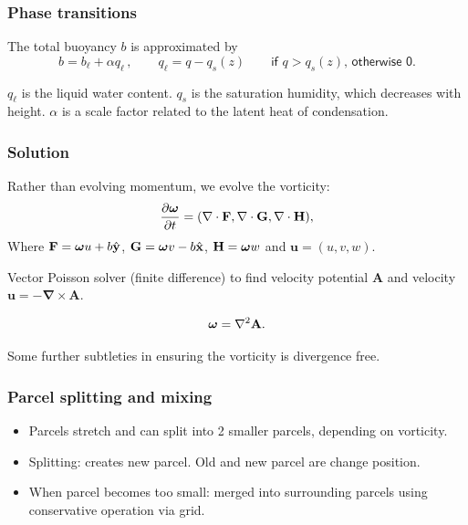 \documentclass{beamer}
\def\oran#1{\color{orange} #1}
\def\re#1{\color{red}   #1}
\def\bl#1{\color{blue}  #1}
\newcommand{\bel}{\ensuremath{b_\ell}}
\renewcommand{\v}[1]{\ensuremath{\mathbf{#1}}} %
\newcommand{\gv}[1]{\ensuremath{\mbox{\boldmath$ #1 $}}}
\newcommand{\uv}[1]{\hat{\ensuremath{\mathbf{ #1 }}}} %
\newcommand{\pd}[2]{\frac{\partial #1}{\partial #2}}
\renewcommand{\div}[1]{\v{\nabla} \cdot #1} %
\newcommand{\curl}[1]{\v{\nabla} \times #1} %
\begin{document}
\begin{frame}
\frametitle{Phase transitions}
The {\re total buoyancy} $b$ is approximated by
\begin{equation}
b = \bel+\alpha q_\ell \,,\qquad q_\ell =q-q_s(z) \qquad \textsf{if } q>q_s(z) \textsf{, otherwise 0}.
\nonumber
\end{equation}

$q_\ell$ is the {\bl liquid water content}. \newline
$q_s$ is the {\oran saturation humidity}, which decreases with height. \newline
$\alpha$ is a scale factor related to the {\re latent heat of condensation.} \newline

\end{frame}

\begin{frame}
\frametitle{Solution}

Rather than evolving momentum, we evolve the vorticity:
\begin{equation}
  \pd{\gv{\omega}}{t} = ( \div{\v{F}},\div{\v{G}},\div{\v{H}}), \nonumber
\end{equation}
Where $\v{F} = \gv{\omega}u + b \uv{y} $, $\v{G}=\gv{\omega}v - b \uv{x}$, $\v{H}=\gv{\omega}w$ and $\v{u}= (u,v,w)$.

\vspace{0.5cm}

Vector Poisson solver (finite difference) to find velocity potential $\v{A}$ and velocity $\v{u} = - \curl{\v{A}}$.

\begin{equation}
  \gv{\omega} = \v{\nabla}^2 \v{A}. \nonumber
\end{equation}

Some further subtleties in ensuring the vorticity is divergence free.

\end{frame}

\begin{frame}
\frametitle{Parcel splitting and mixing}

\begin{itemize}
\item Parcels stretch and can split into 2 smaller parcels, depending on vorticity.
\item Splitting: creates new parcel. Old and new parcel are change position.
\item When parcel becomes too small: merged into surrounding parcels using conservative operation via grid.
\end{itemize}

\end{frame}
\end{document}
